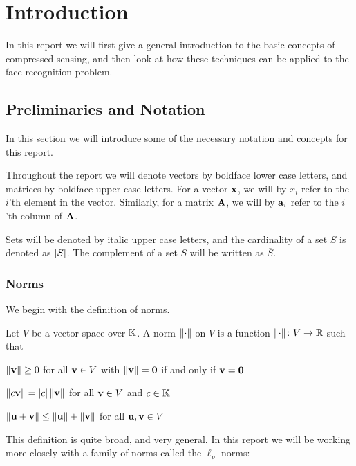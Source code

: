 \chapter{Introduction}

In this report we will first give a general introduction to the basic concepts of compressed sensing, and then look at how these techniques can be applied to the face recognition problem. 


\section{Preliminaries and Notation}
In this section we will introduce some of the necessary notation and concepts for this report. 

Throughout the report we will denote vectors by boldface lower case letters, and matrices by boldface upper case letters. For a vector $ \mathbf{x} $, we will by $ x_{i} $ refer to the $ i $'th element in the vector. Similarly, for a matrix $ \mathbf{A} $, we will by $ \mathbf{a}_{i} $ refer to the $ i $'th  column of $ \mathbf{A} $. 

Sets will be denoted by italic upper case letters, and the cardinality of a set $ S $ is denoted as $ \left|S\right| $. The complement of a set $ S $ will be written as $ \overline{S} $. 

\subsection{Norms}
We begin with the definition of norms. 

\begin{definition} \label{def:norm}
	Let $ V $ be a vector space over $ \mathbb{K} $.  A norm $ \lVert\cdot\rVert $ on $ V $ is a function $ \lVert\cdot\rVert\colon V \to\mathbb{R} $ such that
	\begin{subdef}
		\item $ \lVert\mathbf{v}\rVert \geq 0 $ for all $ \mathbf{v} \in V $ with $ \lVert\mathbf{v}\rVert = \mathbf{0} $ if and only if $ \mathbf{v} = \mathbf{0} $
		\item $ \lVert c\mathbf{v}\rVert = \left|c\right|\lVert\mathbf{v}\rVert $ for all $ \mathbf{v} \in V $ and $ c \in \mathbb{K} $
		\item $ \lVert\mathbf{u} + \mathbf{v}\rVert \leq \lVert\mathbf{u}\rVert + \lVert\mathbf{v}\rVert $ for all $ \mathbf{u},  \mathbf{v} \in V $
	\end{subdef}
\end{definition}

This definition is quite broad, and very general. In this report we will be working more closely with a family of norms called the $ \ell_{p} $ norms:

